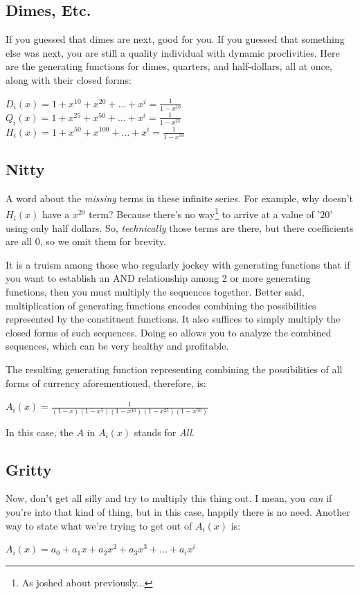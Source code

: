\subsection{Dimes, Etc.}
If you guessed that dimes are next, good for you.  If you guessed that something else was next, you are still a quality individual with dynamic proclivities. Here are the generating functions for dimes, quarters, and half-dollars, all at once, along with their closed forms:
\begin{center}
$D_i(x) = 1 + x^{10} + x^{20} + \ldots + x^i = \displaystyle\frac{1}{1-x^{10}}$
\\[1em]
$Q_i(x) = 1 + x^{25} + x^{50} + \ldots + x^i = \displaystyle\frac{1}{1-x^{25}}$
\\[1em]
$H_i(x) = 1 + x^{50} + x^{100} + \ldots + x^i = \displaystyle\frac{1}{1-x^{50}}$
\end{center}

\subsection{Nitty}
A word about the \textit{missing} terms in these infinite series.  For example, why doesn't $H_i(x)$ have a $x^{20}$ term?  Because there's no way\footnote{As joshed about previously...} to arrive at a value of '$20$' using only half dollars.  So, \textit{technically} those terms are there, but there coefficients are all $0$, so we omit them for brevity.

It is a truism among those who regularly jockey with generating functions that if you want to establish an AND relationship among 2 or more generating functions, then you must multiply the sequences together.  Better said, multiplication of generating functions encodes combining the possibilities represented by the constituent functions. It also suffices to simply multiply the closed forms of such sequences.  Doing so allows you to analyze the combined sequences, which can be very healthy and profitable.

The resulting generating function representing combining the possibilities of all forms of currency aforementioned, therefore, is:
\begin{center}
$A_i(x) = \displaystyle\frac{1}{(1-x)(1-x^5)(1-x^{10})(1-x^{25})(1-x^{50})}$
\end{center}
In this case, the $A$ in $A_i(x)$ stands for \textit{All}.

\subsection{Gritty}
Now, don't get all silly and try to multiply this thing out.  I mean, you \textit{can} if you're into that kind of thing, but in this case, happily there is no need.  Another way to state what we're trying to get out of $A_i(x)$ is:
\begin{center}
$A_i(x) = a_0 + a_1x + a_2x^2 + a_3x^3 + ... + a_ix^i$
\end{center}

